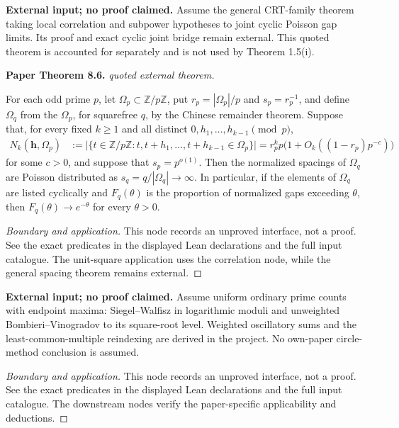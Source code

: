 \begin{lemma}
\label{input_gk}
\textbf{External input; no proof claimed.} Assume the general CRT-family theorem taking local correlation and subpower hypotheses to joint cyclic Poisson gap limits. Its proof and exact cyclic joint bridge remain external. This quoted theorem is accounted for separately and is not used by Theorem 1.5(i).
\par\medskip\noindent\textbf{Paper Theorem 8.6.} \textit{quoted external theorem.}\par
For each odd prime $p$, let $\Omega_p\subset\mathbb Z/p\mathbb Z$, put
$r_p=|\Omega_p|/p$ and $s_p=r_p^{-1}$, and define $\Omega_q$ from the
$\Omega_p$, for squarefree $q$, by the Chinese remainder theorem.  Suppose
that, for every fixed $k\geq1$ and all distinct
$0,h_1,\ldots,h_{k-1}\pmod p$,
\begin{align}
 N_k(\mathbf h,\Omega_p)
 &:=\big|\{t\in \mathbb{Z}/p\mathbb{Z}:t,t+h_1,\ldots,t+h_{k-1}\in\Omega_p\}\big|=r_p^kp\big(1+O_k((1-r_p)p^{-c})\big)             
\end{align}
for some $c>0$, and suppose that $s_p=p^{o(1)}$.  Then the normalized spacings
of $\Omega_q$ are Poisson distributed as $s_q=q/|\Omega_q|\to\infty$.
In particular, if the elements of $\Omega_q$ are listed cyclically and
$F_q(\theta)$ is the proportion of normalized gaps exceeding $\theta$, then
$F_q(\theta)\to e^{-\theta}$ for every $\theta>0$.
\end{lemma}
\begin{proof}[Boundary and application]
This node records an unproved interface, not a proof. See the exact predicates in the displayed Lean declarations and the full input catalogue. The unit-square application uses the correlation node, while the general spacing theorem remains external.
\end{proof}

\begin{lemma}
\label{input_sw_bv}
\uses{}
\textbf{External input; no proof claimed.} Assume uniform ordinary prime counts with endpoint maxima: Siegel--Walfisz in logarithmic moduli and unweighted Bombieri--Vinogradov to its square-root level. Weighted oscillatory sums and the least-common-multiple reindexing are derived in the project. No own-paper circle-method conclusion is assumed.
\end{lemma}
\begin{proof}[Boundary and application]
\uses{}
This node records an unproved interface, not a proof. See the exact predicates in the displayed Lean declarations and the full input catalogue. The downstream nodes verify the paper-specific applicability and deductions.
\end{proof}

